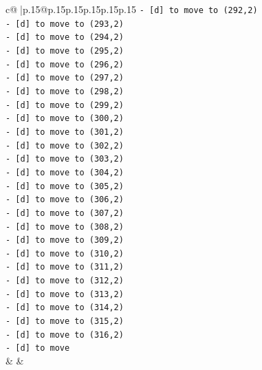 \documentclass{article}
\begin{document}
{\begin{supertabular}{c@{$\;$}|p{.15\linewidth}@{}p{.15\linewidth}p{.15\linewidth}p{.15\linewidth}p{.15\linewidth}p{.15\linewidth}}
{{{\texttt{{-} {[}d{]} to move to (292,2)} \\
\texttt{{-} {[}d{]} to move to (293,2)} \\
\texttt{{-} {[}d{]} to move to (294,2)} \\
\texttt{{-} {[}d{]} to move to (295,2)} \\
\texttt{{-} {[}d{]} to move to (296,2)} \\
\texttt{{-} {[}d{]} to move to (297,2)} \\
\texttt{{-} {[}d{]} to move to (298,2)} \\
\texttt{{-} {[}d{]} to move to (299,2)} \\
\texttt{{-} {[}d{]} to move to (300,2)} \\
\texttt{{-} {[}d{]} to move to (301,2)} \\
\texttt{{-} {[}d{]} to move to (302,2)} \\
\texttt{{-} {[}d{]} to move to (303,2)} \\
\texttt{{-} {[}d{]} to move to (304,2)} \\
\texttt{{-} {[}d{]} to move to (305,2)} \\
\texttt{{-} {[}d{]} to move to (306,2)} \\
\texttt{{-} {[}d{]} to move to (307,2)} \\
\texttt{{-} {[}d{]} to move to (308,2)} \\
\texttt{{-} {[}d{]} to move to (309,2)} \\
\texttt{{-} {[}d{]} to move to (310,2)} \\
\texttt{{-} {[}d{]} to move to (311,2)} \\
\texttt{{-} {[}d{]} to move to (312,2)} \\
\texttt{{-} {[}d{]} to move to (313,2)} \\
\texttt{{-} {[}d{]} to move to (314,2)} \\
\texttt{{-} {[}d{]} to move to (315,2)} \\
\texttt{{-} {[}d{]} to move to (316,2)} \\
\texttt{{-} {[}d{]} to move} \\
            }
        }
    }
    & & \\ \\


\end{supertabular}}
\end{document}
